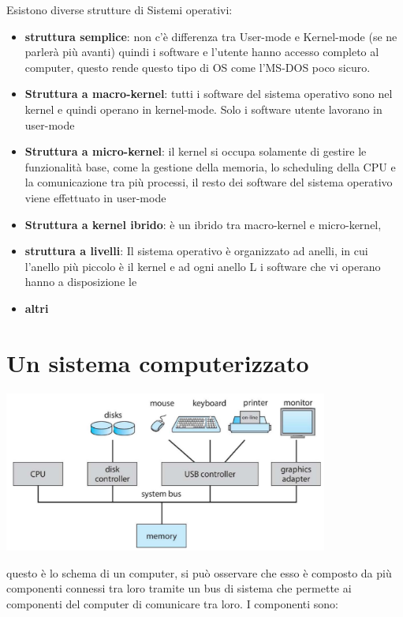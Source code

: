 \documentclass{article}
\begin{document}
    Esistono diverse strutture di Sistemi operativi:
            \begin{itemize}
                \item \textbf{struttura semplice}:
                    non c'è differenza tra User-mode e Kernel-mode (se ne parlerà più avanti) quindi i software e l'utente hanno accesso completo al computer, questo rende questo tipo di OS come l'MS-DOS poco sicuro.
                \item \textbf{Struttura a macro-kernel}:
                    tutti i software del sistema operativo sono nel kernel e quindi operano in kernel-mode. Solo i software utente lavorano in user-mode
                \item \textbf{Struttura a micro-kernel}:
                    il kernel si occupa solamente di gestire le funzionalità base, come la gestione della memoria, lo scheduling della CPU e la comunicazione tra più processi, il resto dei software del sistema operativo viene effettuato in user-mode
                \item \textbf{Struttura a kernel ibrido}:
                    è un ibrido tra macro-kernel e micro-kernel,
                \item \textbf{struttura a livelli}:
                Il sistema operativo è organizzato ad anelli, in cui l'anello più piccolo è il kernel e ad ogni anello L i software che vi operano hanno a disposizione le 
                \item \textbf{altri}
            \end{itemize}
\section{Un sistema computerizzato}

    \begin{center}
    \includegraphics[width=0.8\textwidth]{immagini/immagine.png}
    \end{center}
    questo è lo schema di un computer, si può osservare che esso è composto da più componenti connessi tra loro tramite un bus di sistema che permette ai componenti del computer di comunicare tra loro. I componenti sono:
\end{document}
